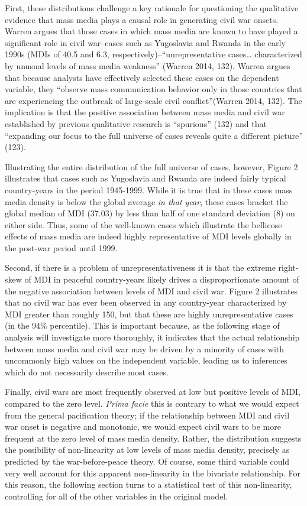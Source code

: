 \documentclass[11pt,article,oneside]{memoir}
\begin{document}
First, these distributions challenge a key rationale for questioning the
qualitative evidence that mass media plays a causal role in generating
civil war onsets. Warren argues that those cases in which mass media are
known to have played a significant role in civil war--cases such as
Yugoslavia and Rwanda in the early 1990s (MDIs of 40.5 and 6.3,
respectively)--``unrepresentative cases\ldots{} characterized by unusual
levels of mass media weakness'' (Warren 2014, 132). Warren argues that
because analysts have effectively selected these cases on the dependent
variable, they ``observe mass communication behavior only in those
countries that are experiencing the outbreak of large-scale civil
conflict''(Warren 2014, 132). The implication is that the positive
association between mass media and civil war established by previous
qualitative research is ``spurious'' (132) and that ``expanding our
focus to the full universe of cases reveals quite a different picture''
(123).

Illustrating the entire distribution of the full universe of cases,
however, Figure 2 illustrates that cases such as Yugoslavia and Rwanda
are indeed fairly typical country-years in the period 1945-1999. While
it is true that in these cases mass media density is below the global
average \emph{in that year}, these cases bracket the global median of
MDI (37.03) by less than half of one standard deviation (8) on either
side. Thus, some of the well-known cases which illustrate the bellicose
effects of mass media are indeed highly representative of MDI levels
globally in the post-war period until 1999.

Second, if there is a problem of unrepresentativeness it is that the
extreme right-skew of MDI in peaceful country-years likely drives a
disproportionate amount of the negative association between levels of
MDI and civil war. Figure 2 illustrates that no civil war has ever been
observed in any country-year characterized by MDI greater than roughly
150, but that these are highly unrepresentative cases (in the 94\%
percentile). This is important because, as the following stage of
analysis will investigate more thoroughly, it indicates that the actual
relationship between mass media and civil war may be driven by a
minority of cases with uncommonly high values on the independent
variable, leading us to inferences which do not necessarily describe
most cases.

Finally, civil wars are most frequently observed at low but positive
levels of MDI, compared to the zero level. \emph{Prima facie} this is
contrary to what we would expect from the general pacification theory;
if the relationship between MDI and civil war onset is negative and
monotonic, we would expect civil wars to be more frequent at the zero
level of mass media density. Rather, the distribution suggests the
possibility of non-linearity at low levels of mass media density,
precisely as predicted by the war-before-peace theory. Of course, some
third variable could very well account for this apparent non-linearity
in the bivariate relationship. For this reason, the following section
turns to a statistical test of this non-linearity, controlling for all
of the other variables in the original model.
\end{document}
